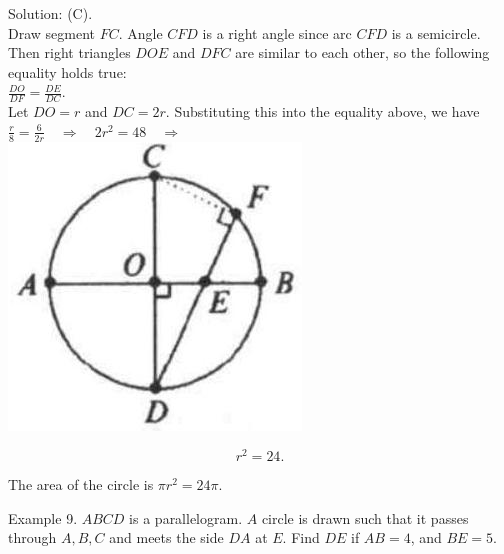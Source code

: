 \documentclass[10pt]{article}
\begin{document}
Solution: (C).\\
Draw segment \(F C\). Angle \(C F D\) is a right angle since arc \(C F D\) is a semicircle. Then right triangles \(D O E\) and \(D F C\) are similar to each other, so the following equality holds true:\\
\(\frac{D O}{D F}=\frac{D E}{D C}\).\\
Let \(D O=r\) and \(D C=2 r\). Substituting this into the equality above, we have \(\frac{r}{8}=\frac{6}{2 r} \quad \Rightarrow \quad 2 r^{2}=48 \quad \Rightarrow\)\\
\includegraphics[max width=\textwidth, center]{2025_04_17_97bc1f7e44d93c271a88g-167(1)}

\[
r^{2}=24 .
\]

The area of the circle is \(\pi r^{2}=24 \pi\).

Example 9. \(A B C D\) is a parallelogram. \(A\) circle is drawn such that it passes through \(A, B, C\) and meets the side \(D A\) at \(E\). Find \(D E\) if \(A B=4\), and \(B E=5\).
\end{document}
